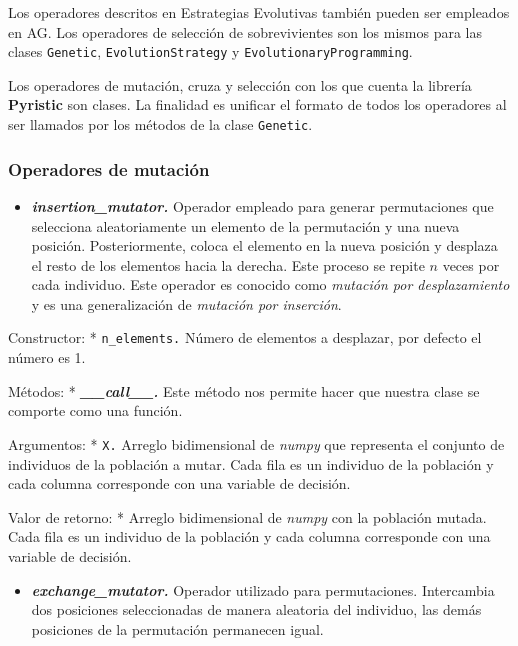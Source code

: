 \documentclass[11pt]{article}
\providecommand{\tightlist}{%
      \setlength{\itemsep}{0pt}\setlength{\parskip}{0pt}}
\begin{document}
    Los operadores descritos en Estrategias Evolutivas también pueden ser
empleados en AG. Los operadores de selección de sobrevivientes son los
mismos para las clases \texttt{Genetic}, \texttt{EvolutionStrategy} y
\texttt{EvolutionaryProgramming}.

Los operadores de mutación, cruza y selección con los que cuenta la
librería \textbf{Pyristic} son clases. La finalidad es unificar el
formato de todos los operadores al ser llamados por los métodos de la
clase \texttt{Genetic}.

    \subsubsection{Operadores de mutación}\label{operadores-de-mutaciuxf3n}

    \begin{itemize}
\tightlist
\item
  \emph{\textbf{insertion\_mutator.}} Operador empleado para generar
  permutaciones que selecciona aleatoriamente un elemento de la
  permutación y una nueva posición. Posteriormente, coloca el elemento
  en la nueva posición y desplaza el resto de los elementos hacia la
  derecha. Este proceso se repite \(n\) veces por cada individuo. Este
  operador es conocido como \emph{mutación por desplazamiento} y es una
  generalización de \emph{mutación por inserción}.
\end{itemize}

Constructor: * \texttt{n\_elements.} Número de elementos a desplazar,
por defecto el número es 1.

Métodos: * \emph{\textbf{\_\_call\_\_.}} Este método nos permite hacer
que nuestra clase se comporte como una función.

Argumentos: * \texttt{X.} Arreglo bidimensional de \emph{numpy} que
representa el conjunto de individuos de la población a mutar. Cada fila
es un individuo de la población y cada columna corresponde con una
variable de decisión.

Valor de retorno: * Arreglo bidimensional de \emph{numpy} con la
población mutada. Cada fila es un individuo de la población y cada
columna corresponde con una variable de decisión.

    \begin{itemize}
\tightlist
\item
  \emph{\textbf{exchange\_mutator.}} Operador utilizado para
  permutaciones. Intercambia dos posiciones seleccionadas de manera
  aleatoria del individuo, las demás posiciones de la permutación
  permanecen igual.
\end{itemize}
\end{document}
